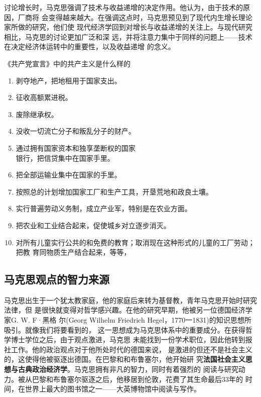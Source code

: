 讨论增长时，马克思强调了技术与收益递增的决定作用。他认为，由于技术的原因，厂商将
会变得越来越大。在强调这点时，马克思预见到了现代内生增长理论家所做的研究，他们使
现代经济学回到对增长与收益递增的关注上。与现代研究相比，马克思的讨论更加广泛和深
远，并将注意力集中于同样的问题上——技术在决定经济体运转中的重要性，以及收益递增
的念义。\clearpage
\begin{mybox}{《共产党宣言》中的共产主义是什么样的}
  \begin{multicols}{2}
    \begin{enumerate}
    \item 剥夺地产，把地租用于国家支出。
    \item 征收高额累进税。
    \item 废除继承权。
    \item 没收一切流亡分子和叛乱分子的财产。
    \item 通过拥有国家资本和独享垄断权的国家\\银行，把信贷集中在国家手里。
    \item 把全部运输业集中在国家的手里。
    \item 按照总的计划增加国家工厂和生产工具，开垦荒地和政良土壤。
    \item 实行普遍劳动义务制，成立产业军，特别是在农业方面。
    \item 把农业和工业结合起来，促使城乡对立逐步消灭。
    \item 对所有儿童实行公共的和免费的教育；取消现在这种形式的儿童的工厂劳动；把教
      育同物质生产结合起来，等等，
    \end{enumerate}
  \end{multicols}
\end{mybox}

\subsection{马克思观点的智力来源}
马克思出生于一个犹太教家庭，他的家庭后来转为基督教，青年马克思开始时研究法律，但
是很快就变得对哲学感兴趣。在他的研究早期，他被另一位德国经济学家G. W. F·黑格
尔(Georg Wilhelm Friedrich Hegel，1770一1831)的知识思想所吸引。就像我们将要看到的，
这一思想成为马克思体系中的重要成分。在获得哲学博士学位之后，由于观点激进，马克思
未能找到一份学术职位，因此他转到报社工作。他的政治观点对于他所处时代的德国来说，
是激进的但还不是社会主义的，这使得他被驱逐出德国。在巴黎和和布鲁塞尔，他开始研
究\textbf{法国社会主义思想与古典政治经济学}。马克思拥有非凡的智力，同时有着强烈的
阅读与研究动力。被从巴黎和布鲁塞尔驱逐之后，他移居到伦敦，花费了其生命最后33年的
时间，在世界上最大的图书馆之一——大英博物馆中阅读与写作。

